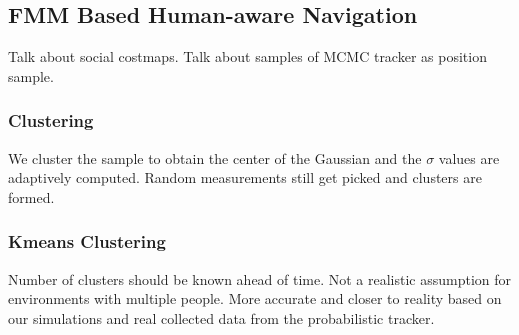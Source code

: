 

\subsection{FMM Based Human-aware Navigation}

Talk about social costmaps.
Talk about samples of MCMC tracker as position sample.
\subsubsection{Clustering}
We cluster the sample to obtain the center of the Gaussian and the $\sigma$ values are adaptively computed.
Random measurements still get picked and clusters are formed.

\subsubsection*{Kmeans Clustering}
Number of clusters should be known ahead of time. Not a realistic assumption for environments with multiple people. More accurate and closer to reality based on our simulations and real collected data from the probabilistic tracker.


